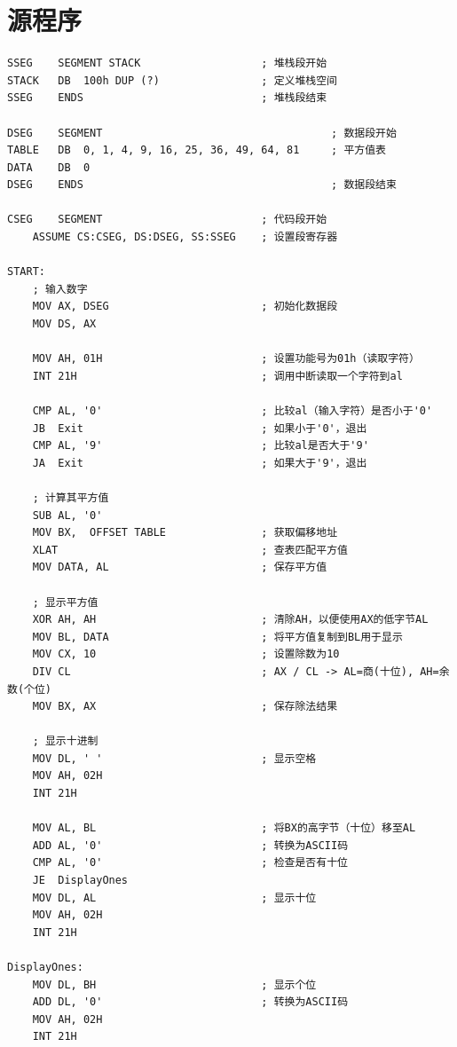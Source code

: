 \documentclass[12pt]{article}
\begin{document}
\section{源程序}
    \begin{lstlisting}[caption={汇编源代码}, label=lst:asm2]
SSEG    SEGMENT STACK                   ; 堆栈段开始
STACK   DB  100h DUP (?)                ; 定义堆栈空间
SSEG    ENDS                            ; 堆栈段结束

DSEG    SEGMENT                                    ; 数据段开始
TABLE   DB  0, 1, 4, 9, 16, 25, 36, 49, 64, 81     ; 平方值表
DATA    DB  0
DSEG    ENDS                                       ; 数据段结束

CSEG    SEGMENT                         ; 代码段开始
    ASSUME CS:CSEG, DS:DSEG, SS:SSEG    ; 设置段寄存器

START:
    ; 输入数字
    MOV AX, DSEG                        ; 初始化数据段
    MOV DS, AX

    MOV AH, 01H                         ; 设置功能号为01h（读取字符）
    INT 21H                             ; 调用中断读取一个字符到al

    CMP AL, '0'                         ; 比较al（输入字符）是否小于'0'
    JB  Exit                            ; 如果小于'0'，退出
    CMP AL, '9'                         ; 比较al是否大于'9'
    JA  Exit                            ; 如果大于'9'，退出

    ; 计算其平方值
    SUB AL, '0'
    MOV BX,  OFFSET TABLE               ; 获取偏移地址
    XLAT                                ; 查表匹配平方值
    MOV DATA, AL                        ; 保存平方值

    ; 显示平方值
    XOR AH, AH                          ; 清除AH，以便使用AX的低字节AL
    MOV BL, DATA                        ; 将平方值复制到BL用于显示
    MOV CX, 10                          ; 设置除数为10
    DIV CL                              ; AX / CL -> AL=商(十位), AH=余数(个位)
    MOV BX, AX                          ; 保存除法结果

    ; 显示十进制
    MOV DL, ' '                         ; 显示空格
    MOV AH, 02H
    INT 21H

    MOV AL, BL                          ; 将BX的高字节（十位）移至AL
    ADD AL, '0'                         ; 转换为ASCII码
    CMP AL, '0'                         ; 检查是否有十位
    JE  DisplayOnes
    MOV DL, AL                          ; 显示十位
    MOV AH, 02H
    INT 21H

DisplayOnes:
    MOV DL, BH                          ; 显示个位
    ADD DL, '0'                         ; 转换为ASCII码
    MOV AH, 02H
    INT 21H


\end{lstlisting}
\end{document}
